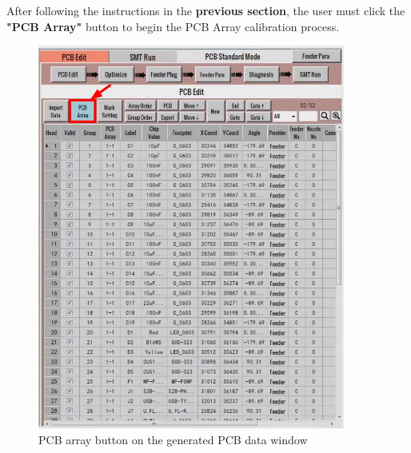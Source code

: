 \documentclass[a4paper,10pt]{report}
\begin{document}
After following the instructions in the \textbf{previous section}, the user must click the \textbf{"PCB Array"} button to begin the PCB Array calibration process.
\begin{figure}[!htb]
 \centering
 \includegraphics[width=0.9\textwidth]{images/scrot7.png}
 \caption{PCB array button on the generated PCB data window}
\end{figure}
\newpage
\end{document}
